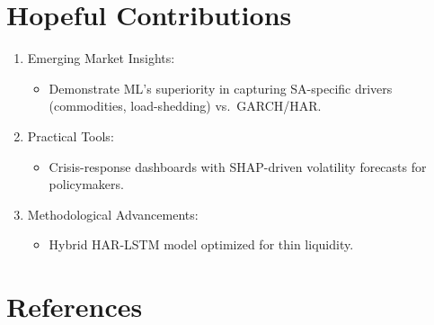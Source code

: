\documentclass[11pt,preprint]{elsarticle}
\numberwithin{equation}{section}
\numberwithin{figure}{section}
\numberwithin{table}{section}
\def\tightlist{} %
\begin{document}
\section{Hopeful Contributions}\label{hopeful-contributions}

\begin{enumerate}
\def\labelenumi{\arabic{enumi}.}
\tightlist
\item
  Emerging Market Insights:

  \begin{itemize}
  \tightlist
  \item
    Demonstrate ML's superiority in capturing SA-specific drivers
    (commodities, load-shedding) vs.~GARCH/HAR.\\
  \end{itemize}
\item
  Practical Tools:

  \begin{itemize}
  \tightlist
  \item
    Crisis-response dashboards with SHAP-driven volatility forecasts for
    policymakers.\\
  \end{itemize}
\item
  Methodological Advancements:

  \begin{itemize}
  \tightlist
  \item
    Hybrid HAR-LSTM model optimized for thin liquidity.
  \end{itemize}
\end{enumerate}

\newpage

\section*{References}\label{references}
\end{document}
